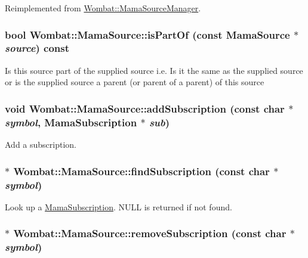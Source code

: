 Reimplemented from \hyperlink{classWombat_1_1MamaSourceManager_aea217b2281827fd1d3abfb49062b8c46}{Wombat::MamaSourceManager}.\hypertarget{classWombat_1_1MamaSource_a16a0fa61551e7ab73a85fcd89b812c99}{
\subsubsection[{isPartOf}]{\setlength{\rightskip}{0pt plus 5cm}bool Wombat::MamaSource::isPartOf (const {\bf MamaSource} $\ast$ {\em source}) const}}
\label{classWombat_1_1MamaSource_a16a0fa61551e7ab73a85fcd89b812c99}


Is this source part of the supplied source i.e. Is it the same as the supplied source or is the supplied source a parent (or parent of a parent) of this source \hypertarget{classWombat_1_1MamaSource_ad1b8bce6e72f7c76da3015caa33db50e}{
\subsubsection[{addSubscription}]{\setlength{\rightskip}{0pt plus 5cm}void Wombat::MamaSource::addSubscription (const char $\ast$ {\em symbol}, \/  {\bf MamaSubscription} $\ast$ {\em sub})}}
\label{classWombat_1_1MamaSource_ad1b8bce6e72f7c76da3015caa33db50e}


Add a subscription. \hypertarget{classWombat_1_1MamaSource_ae6971d65242d7fb6b3079e0c80fe6661}{
\subsubsection[{findSubscription}]{$\ast$ Wombat::MamaSource::findSubscription (const char $\ast$ {\em symbol})}}
\label{classWombat_1_1MamaSource_ae6971d65242d7fb6b3079e0c80fe6661}


Look up a \hyperlink{classWombat_1_1MamaSubscription}{MamaSubscription}. NULL is returned if not found. \hypertarget{classWombat_1_1MamaSource_ac1b23c0842fc58e12e9e7dabe72445e0}{
\subsubsection[{removeSubscription}]{$\ast$ Wombat::MamaSource::removeSubscription (const char $\ast$ {\em symbol})}}
\label{classWombat_1_1MamaSource_ac1b23c0842fc58e12e9e7dabe72445e0}


